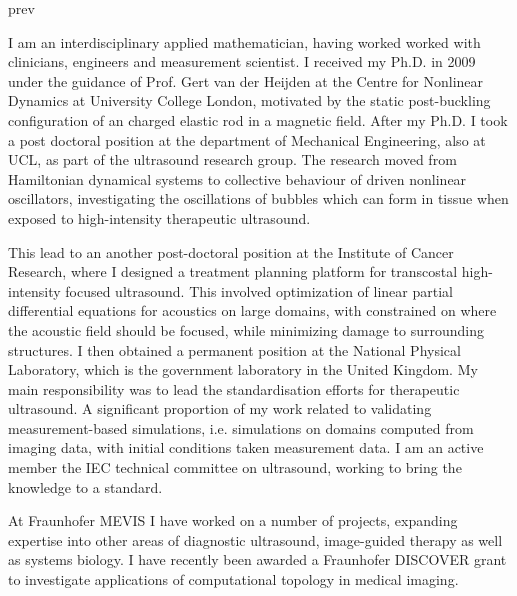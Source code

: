 \documentclass[11pt, a4paper, sans]{moderncv}
\begin{document}
\begin{btUnit} 
\begin{btSect}{prev} 

I am an interdisciplinary applied mathematician, having worked worked with clinicians, engineers and measurement scientist. I received my Ph.D. in 2009 under the guidance of Prof. Gert van der Heijden at the Centre for Nonlinear Dynamics at University College London, motivated by the static post-buckling configuration of an charged elastic rod in a magnetic field. After my Ph.D. I took a post doctoral position at the department of Mechanical Engineering, also at UCL, as part of the ultrasound research group. The research moved from Hamiltonian dynamical systems to collective behaviour of driven nonlinear oscillators, investigating the oscillations of bubbles which can form in tissue when exposed to high-intensity therapeutic ultrasound.

This lead to an another post-doctoral position at the Institute of Cancer Research, where I designed a treatment planning platform for transcostal high-intensity focused ultrasound. This involved optimization of linear partial differential equations for acoustics on large domains, with constrained on where the acoustic field should be focused, while minimizing damage to surrounding structures. I then obtained a permanent position at the National Physical Laboratory, which is the government laboratory in the United Kingdom. My main responsibility was to lead the standardisation efforts for therapeutic ultrasound. A significant proportion of my work related to validating measurement-based simulations, i.e. simulations on domains computed from imaging data, with initial conditions taken measurement data. I am an active member the IEC technical committee on ultrasound, working to bring the knowledge to a standard. 

At Fraunhofer MEVIS I have worked on a number of projects, expanding expertise into other areas of diagnostic ultrasound, image-guided therapy as well as systems biology. I have recently been awarded a Fraunhofer DISCOVER grant to investigate applications of computational topology in medical imaging.


\end{btSect} 
\end{btUnit}

\end{document}
